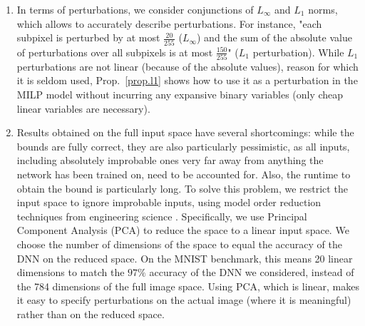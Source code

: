 \begin{enumerate}
   \item  In terms of perturbations, we consider conjunctions of $L_\infty$ and $L_1$ norms, which allows to accurately describe perturbations. For instance, "each subpixel is perturbed by at most $\frac{20}{255}$ ($L_\infty$) and the sum of the absolute value of perturbations over all subpixels is at most $\frac{150}{255}$" ($L_1$ perturbation). While $L_1$ perturbations are not linear (because of the absolute values), reason for which it is seldom used, Prop.~\ref{prop.l1} shows how to use it as a perturbation in the MILP model without incurring any expansive binary variables (only cheap linear variables are necessary).

	\item Results obtained on the full input space have several shortcomings: while the bounds are fully correct, they are also particularly pessimistic, as all inputs, including absolutely improbable ones very far away from anything the network has been trained on, need to be accounted for. Also, the runtime to obtain the bound is particularly long. 
	To solve this problem, we restrict the input space to ignore improbable inputs, using model order reduction techniques from engineering science \cite{aiware}. Specifically, we use Principal Component Analysis (PCA) to reduce the space to a linear input space. We choose the number of dimensions of the space to equal the accuracy of the DNN on the reduced space. 
	On the MNIST benchmark, this means 20 linear dimensions to match the $97\%$ accuracy of the DNN we considered, instead of the 784 dimensions of the full image space. Using PCA, which is linear, makes it easy to specify perturbations on the actual image (where it is meaningful) rather than on the reduced space.


\end{enumerate}

